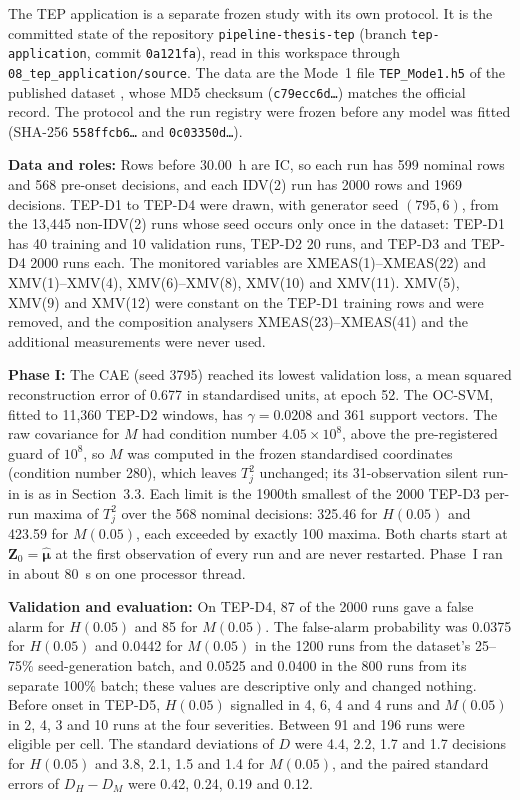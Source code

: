 The TEP application is a separate frozen study with its own protocol. It is the committed state of
the repository \texttt{pipeline-thesis-tep} (branch \texttt{tep-application}, commit
\texttt{0a121fa}), read in this workspace through \texttt{08\_tep\_application/source}. The data
are the Mode~1 file \texttt{TEP\_Mode1.h5} of the published dataset \citep{reinartz_tennessee_2021},
whose MD5 checksum (\texttt{c79ecc6d\ldots}) matches the official record. The protocol and the run
registry were frozen before any model was fitted (SHA-256 \texttt{558ffcb6\ldots} and
\texttt{0c03350d\ldots}).

\textbf{Data and roles:} Rows before 30.00~h are IC, so each run has 599 nominal rows and
568 pre-onset decisions, and each IDV(2) run has 2000 rows and 1969 decisions. TEP-D1 to TEP-D4 were
drawn, with generator seed $(795,6)$, from the 13{,}445 non-IDV(2) runs whose seed occurs only once
in the dataset: TEP-D1 has 40 training and 10 validation runs, TEP-D2 20 runs, and TEP-D3 and TEP-D4
2000 runs each. The monitored variables are XMEAS(1)--XMEAS(22) and XMV(1)--XMV(4), XMV(6)--XMV(8),
XMV(10) and XMV(11). XMV(5), XMV(9) and XMV(12) were constant on the TEP-D1 training rows and were
removed, and the composition analysers XMEAS(23)--XMEAS(41) and the additional measurements were never
used.

\textbf{Phase I:} The CAE (seed 3795) reached its lowest validation loss, a mean squared
reconstruction error of 0.677 in standardised units, at epoch 52. The OC-SVM, fitted to 11{,}360
TEP-D2 windows, has $\gamma=0.0208$ and 361 support vectors. The raw covariance for $M$ had condition
number $4.05\times10^8$, above the pre-registered guard of $10^8$, so $M$ was computed in the frozen
standardised coordinates (condition number 280), which leaves $T_j^2$ unchanged; its 31-observation
silent run-in is as in Section~3.3. Each limit is the 1900th smallest of the 2000 TEP-D3 per-run
maxima of $T_j^2$ over the 568 nominal decisions: 325.46 for $H(0.05)$ and 423.59 for $M(0.05)$, each exceeded by exactly 100 maxima. Both charts start at $\bm{Z}_0=\hat{\bm{\mu}}$ at the first
observation of every run and are never restarted. Phase~I ran in about 80~s on one processor thread.

\textbf{Validation and evaluation:} On TEP-D4, 87 of the 2000 runs gave a false alarm for $H(0.05)$
and 85 for $M(0.05)$. The false-alarm probability was 0.0375 for $H(0.05)$ and 0.0442 for $M(0.05)$
in the 1200 runs from the dataset's 25--75\% seed-generation batch, and
0.0525 and 0.0400 in the 800 runs from its separate 100\% batch; these values are descriptive only
and changed nothing. Before onset in TEP-D5, $H(0.05)$ signalled in 4, 6, 4 and 4 runs and $M(0.05)$
in 2, 4, 3 and 10 runs at the four severities. Between 91 and 196 runs were eligible per cell. The standard deviations of $D$ were 4.4, 2.2, 1.7 and
1.7 decisions for $H(0.05)$ and 3.8, 2.1, 1.5 and 1.4 for $M(0.05)$, and the paired standard errors of
$D_H-D_M$ were 0.42, 0.24, 0.19 and 0.12.

